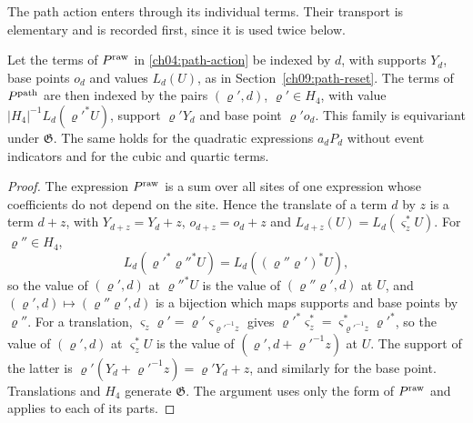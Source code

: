 The path action enters through its individual terms. Their transport
is elementary and is recorded first, since it is used twice below.

\begin{lemma}
\label{ch09:path-channels}
Let the terms of $P^{\rm raw}$ in \eqref{ch04:path-action} be indexed
by $d$, with supports $Y_d$, base points $o_d$ and values
$L_d(U)$, as in Section~\ref{ch09:path-reset}. The terms of
$P^{\rm path}$ are then indexed by the pairs $(\varrho',d)$,
$\varrho'\in H_4$, with value $|H_4|^{-1}L_d(\varrho'^*U)$, support
$\varrho'Y_d$ and base point $\varrho'o_d$. This family is equivariant
under $\mathfrak G$. The same holds for the quadratic expressions
$a_dP_d$ without event indicators and for the cubic and quartic terms.
\end{lemma}

\begin{proof}
The expression $P^{\rm raw}$ is a sum over all sites of one expression
whose coefficients do not depend on the site. Hence the translate of a
term $d$ by $z$ is a term $d+z$, with $Y_{d+z}=Y_d+z$,
$o_{d+z}=o_d+z$ and $L_{d+z}(U)=L_d(\varsigma_z^*U)$. For
$\varrho''\in H_4$,
\[
 L_d(\varrho'^*\varrho''^*U)=L_d((\varrho''\varrho')^*U),
\]
so the value of $(\varrho',d)$ at $\varrho''^*U$ is the value of
$(\varrho''\varrho',d)$ at $U$, and
$(\varrho',d)\mapsto(\varrho''\varrho',d)$ is a bijection which maps
supports and base points by $\varrho''$. For a translation,
$\varsigma_z\varrho'=\varrho'\varsigma_{\varrho'^{-1}z}$ gives
$\varrho'^*\varsigma_z^*=\varsigma_{\varrho'^{-1}z}^*\varrho'^*$, so
the value of $(\varrho',d)$ at $\varsigma_z^*U$ is the value of
$(\varrho',d+\varrho'^{-1}z)$ at $U$. The support of the latter is
$\varrho'(Y_d+\varrho'^{-1}z)=\varrho'Y_d+z$, and similarly for the
base point. Translations and $H_4$ generate $\mathfrak G$. The argument
uses only the form of $P^{\rm raw}$ and applies to each of its parts.
\end{proof}

